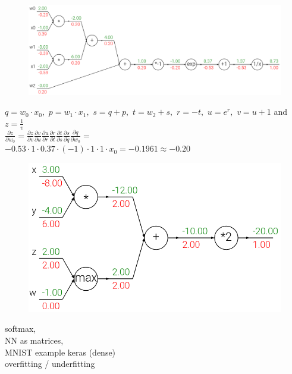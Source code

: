 \documentclass[10pt, compress]{beamer}
\begin{document}
\begin{frame}
  \vspace{1cm}
  \begin{figure}
    \includegraphics[width=1\linewidth]{imgs/backprop_2}
  \end{figure}
  $q = w_0 \cdot x_0,$ \quad $p = w_1 \cdot x_1,$ \quad $s = q + p,$ \quad $t = w_2 + s,$ \quad $r = -t,$ \quad $u = e^r,$ \quad $v = u + 1$ and $z = \frac{1}{v}$ \\
  \Large{$\frac{\partial z}{\partial w_0} = \frac{\partial z}{\partial v}\frac{\partial v}{\partial u}\frac{\partial u}{\partial r}\frac{\partial r}{\partial t}\frac{\partial t}{\partial s}\frac{\partial s}{\partial q}\frac{\partial q}{\partial w_0} = $} \\
  \small{$-0.53 \cdot 1 \cdot 0.37 \cdot (-1) \cdot 1 \cdot 1 \cdot  x_0 = -0.1961 \approx -0.20$}
\end{frame}

\begin{frame}
  \vspace{1cm}
  \begin{figure}
    \includegraphics[width=1\linewidth]{imgs/backprop_3}
  \end{figure}
\end{frame}


\begin{frame}
  \vspace{1cm}
  softmax, \\
  NN as matrices, \\

  MNIST example keras (dense) \\

  overfitting / underfitting

\end{frame}
\end{document}
